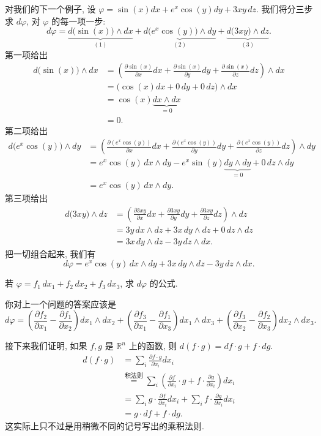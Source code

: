 对我们的下一个例子, 设 $\varphi=\sin(x)dx+e^x\cos(y)dy+3xy\,dz$. 我们将分三步求 $d\varphi$, 对 $\varphi$ 的每一项一步: 
\[
d\varphi=\underbrace{d\bigl(\sin(x)\bigr)\wedge dx}_{(1)}
+\underbrace{d\bigl(e^x\cos(y)\bigr)\wedge dy}_{(2)}
+\underbrace{d\bigl(3xy\bigr)\wedge dz}_{(3)}.
\]
第一项给出
\begin{align*}
d\bigl(\sin(x)\bigr)\wedge dx
&=\left(\frac{\partial\sin(x)}{\partial x}dx+\frac{\partial\sin(x)}{\partial y}dy+\frac{\partial\sin(x)}{\partial z}dz\right)\wedge dx\\
&=\bigl(\cos(x)dx+0\,dy+0\,dz\bigr)\wedge dx\\
&=\cos(x)\underbrace{dx\wedge dx}_{=0}\\
&=0.
\end{align*}
第二项给出
\begin{align*}
d\bigl(e^x\cos(y)\bigr)\wedge dy
&=\left(\frac{\partial(e^x\cos(y))}{\partial x}dx+\frac{\partial(e^x\cos(y))}{\partial y}dy+\frac{\partial(e^x\cos(y))}{\partial z}dz\right)\wedge dy\\
&=e^x\cos(y)\,dx\wedge dy-e^x\sin(y)\underbrace{dy\wedge dy}_{=0}+0\,dz\wedge dy\\
&=e^x\cos(y)\,dx\wedge dy.
\end{align*}
第三项给出
\begin{align*}
d\bigl(3xy\bigr)\wedge dz
&=\left(\frac{\partial 3xy}{\partial x}dx+\frac{\partial 3xy}{\partial y}dy+\frac{\partial 3xy}{\partial z}dz\right)\wedge dz\\
&=3y\,dx\wedge dz+3x\,dy\wedge dz+0\,dz\wedge dz\\
&=3x\,dy\wedge dz-3y\,dz\wedge dx.
\end{align*}
把一切组合起来, 我们有
\[
d\varphi=e^x\cos(y)\,dx\wedge dy+3x\,dy\wedge dz-3y\,dz\wedge dx.
\]

\begin{question}\label{q:4-14}
若 $\varphi=f_1\,dx_1+f_2\,dx_2+f_3\,dx_3$, 求 $d\varphi$ 的公式.
\end{question}

你对上一个问题的答案应该是
\[
d\varphi=\left(\frac{\partial f_2}{\partial x_1}-\frac{\partial f_1}{\partial x_2}\right)dx_1\wedge dx_2
+\left(\frac{\partial f_3}{\partial x_1}-\frac{\partial f_1}{\partial x_3}\right)dx_1\wedge dx_3
+\left(\frac{\partial f_3}{\partial x_2}-\frac{\partial f_2}{\partial x_3}\right)dx_2\wedge dx_3.
\]

接下来我们证明, 如果 $f,g$ 是 $\mathbb{R}^n$ 上的函数, 则 $d(f\cdot g)=df\cdot g+f\cdot dg$.
\begin{align*}
d(f\cdot g)&=\sum_i\frac{\partial f\cdot g}{\partial x_i}dx_i\\
&\overset{\text{积法则}}{=}\sum_i\left(\frac{\partial f}{\partial x_i}\cdot g+f\cdot\frac{\partial g}{\partial x_i}\right)dx_i\\
&=\sum_i g\cdot\frac{\partial f}{\partial x_i}dx_i+\sum_i f\cdot\frac{\partial g}{\partial x_i}dx_i\\
&=g\cdot df+f\cdot dg.
\end{align*}
这实际上只不过是用稍微不同的记号写出的乘积法则.

